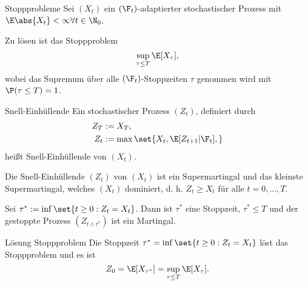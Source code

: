 \begin{karte}{Stoppprobleme}
Sei \((X_t)\) ein \((\F_t)\)-adaptierter stochastischer Prozess mit \(\E \abs{X_t} < \infty \forall t\in\N_0\).

Zu lösen ist das Stoppproblem 
\[ \sup_{\tau \leq T} \E[X_\tau], \]
wobei das Supremum über alle \((\F_t)\)-Stoppzeiten \(\tau\) genommen wird 
mit \(\P(\tau \leq T) = 1\).
\end{karte}

\begin{karte}{Snell-Einhüllende}
Ein stochastischer Prozess \((Z_t)\), definiert durch 
\begin{align*}
    Z_T &:= X_T, \\
    Z_t &:= \max\set{ X_t, \E[Z_{t+1} | \F_t], }
\end{align*}
heißt Snell-Einhüllende von \((X_t)\).

Die Snell-Einhüllende \((Z_t)\) von \((X_t)\) ist ein Supermartingal und das kleinste 
Supermartingal, welches \((X_t)\) dominiert, d. h. \(Z_t \geq X_t\) für alle \(t=0,\ldots, T\).

Sei \(\tau^* := \inf \set{t\geq 0: Z_t = X_t}\). Dann ist 
\(\tau^* \) eine Stoppzeit, \(\tau^* \leq T\) und der gestoppte Prozess 
\((Z_{t\wedge \tau^*})\) ist ein Martingal.
\end{karte}

\begin{karte}{Lösung Stoppproblem}
Die Stoppzeit \(\tau^* = \inf \set{t\geq 0: Z_t = X_t}\) löst das Stoppproblem 
und es ist 
\[ Z_0 = \E[X_{\tau^*}] = \sup_{\tau \leq T} \E[X_\tau]. \]
\end{karte}

\begin{karte}{}

\end{karte}

\begin{karte}{}

\end{karte}
